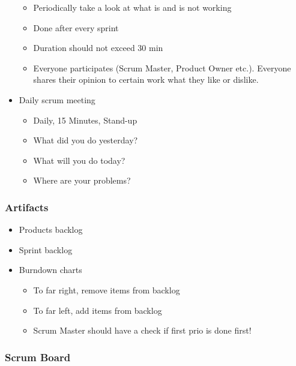 \begin{itemize}
  \begin{itemize}
  \tightlist
  \item
    Periodically take a look at what is and is not working
  \item
    Done after every sprint
    \item 
    Duration should not exceed 30 min
    \item 
    Everyone participates (Scrum Master, Product Owner etc.). Everyone shares their opinion to certain work what they like or dislike.
  \end{itemize}
\item
  Daily scrum meeting

  \begin{itemize}
  \tightlist
  \item
    Daily, 15 Minutes, Stand-up
  \item
    What did you do yesterday?
  \item
    What will you do today?
  \item
    Where are your problems?
  \end{itemize}
\end{itemize}

\hypertarget{artifacts}{%
\subsubsection{Artifacts}\label{artifacts}}

\begin{itemize}
\tightlist
\item
  Products backlog
\item
  Sprint backlog
\item
  Burndown charts
  \begin{itemize}
      \item To far right, remove items from backlog
      \item To far left, add items from backlog
      \item Scrum Master should have a check if first prio is done first!
  \end{itemize}
\end{itemize}

\hypertarget{scrum-board}{%
\subsubsection{Scrum Board}\label{scrum-board}}



